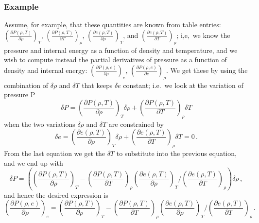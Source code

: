 \documentclass[paper=a4,fontsize=11pt]{scrartcl}
\numberwithin{equation}{section}		%
\numberwithin{figure}{section}			%
\numberwithin{table}{section}				%
\begin{document}
\subsubsection{Example}
Assume, for example, that these quantities are known from table entries:
$\left(\frac{\partial P(\rho,T)}{\partial \rho}\right)_{T}$, 
$\left(\frac{\partial P(\rho,T)}{\partial T}\right)_{\rho}$,  
$\left(\frac{\partial e(\rho,T)}{\partial \rho}\right)_{T}$, 
and 
$\left(\frac{\partial e(\rho,T)}{\partial T}\right)_{\rho}$; 
i,e,\ we know the pressure and internal energy as a function of density and temperature, and we wish to compute instead the partial derivatives of pressure as a function of density and internal energy:
$\left(\frac{\partial P(\rho,e)}{\partial \rho}\right)_{e}$, 
$\left(\frac{\partial P(\rho,e)}{\partial e}\right)_{\rho}$.
We get these by using the combination of $\delta \rho$ and $\delta T$ that keeps $\delta e$ constant; i.e.\ we look at the variation of pressure P
\begin{equation}
\delta P =
\left(\frac{\partial P(\rho,T)}{\partial \rho}\right)_{T} \delta \rho +
\left(\frac{\partial P(\rho,T)}{\partial T}\right)_{\rho} \delta T 
\end{equation}
when the two variations $\delta \rho$ and $\delta T$ are constrained by
\begin{equation}
\delta e =
\left(\frac{\partial e(\rho,T)}{\partial \rho}\right)_{T} \delta \rho +
\left(\frac{\partial e(\rho,T)}{\partial T}\right)_{\rho} \delta T 
= 0 \,.
\end{equation}
From the last equation we get the $\delta T$ to substitute into the previous equation, and we end up with
\begin{equation}
\delta P =
\left(
\left(\frac{\partial P(\rho,T)}{\partial \rho}\right)_{T}  -
\left(\frac{\partial P(\rho,T)}{\partial T}\right)_{\rho} 
\left(\frac{\partial e(\rho,T)}{\partial \rho}\right)_{T} /
\left(\frac{\partial e(\rho,T)}{\partial T}\right)_{\rho}
\right)\delta \rho \,,
\end{equation} 
and hence the desired expression is
\begin{equation}
\left(\frac{\partial P(\rho,e)}{\partial \rho}\right)_{e} =
\left(\frac{\partial P(\rho,T)}{\partial \rho}\right)_{T}  -
\left(\frac{\partial P(\rho,T)}{\partial T}\right)_{\rho} 
\left(\frac{\partial e(\rho,T)}{\partial \rho}\right)_{T} /
\left(\frac{\partial e(\rho,T)}{\partial T}\right)_{\rho} \,.
\end{equation}
\end{document}
